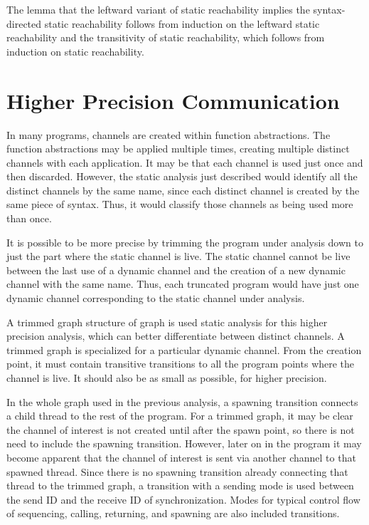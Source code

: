 \documentclass[10pt]{article}
\begin{document}
The lemma that the leftward variant of static reachability implies the syntax-directed static
reachability follows from induction on the leftward static reachability and the
transitivity of static
reachability, which follows from induction on static reachability.

\section{Higher Precision Communication}
In many programs, channels are created within function abstractions.  The function abstractions
may be applied multiple times, creating multiple distinct channels with each application.
It may be that each channel is used just once and then discarded.  However, the static
analysis just described would identify all the distinct channels by the same name, since each
distinct channel is created by the same piece of syntax. Thus, it would classify those channels
as being used more than once.

It is possible to be more precise by trimming the program under analysis down to just the part
where the static channel is live. The static channel cannot be live between the last use of a
dynamic channel and the creation of a new dynamic channel with the same name.  Thus, each
truncated program would have just one dynamic channel corresponding to the static channel under
analysis. 

A trimmed graph structure of graph is used static analysis for this higher precision
analysis, which can better differentiate between distinct channels. 
A trimmed graph is specialized for a particular dynamic channel.  From the creation
point, it must contain transitive transitions to all the program points where the
channel is live. It should also be as small as possible, for higher precision.

In the whole graph used in the previous analysis, a spawning transition
connects a child thread to the rest of the program.  For a trimmed graph,
it may be clear the channel of interest is not created until after the spawn point,
so there is not need to include the spawning transition.  However, later on in the
program it may become apparent that the channel of interest is sent via another channel to
that spawned thread.  Since there is no spawning transition already connecting that
thread to the trimmed graph, a transition with a sending mode is used between the
send ID and the receive ID of synchronization. Modes for typical control flow of
sequencing, calling, returning, and spawning are also included transitions.
\end{document}

